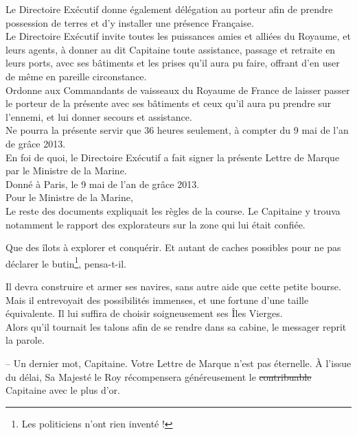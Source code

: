 Le Directoire Exécutif donne également délégation au porteur afin de prendre possession de terres et d'y installer une présence Française.\\

Le Directoire Exécutif invite toutes les puissances amies et alliées du Royaume, et leurs agents, à donner au dit Capitaine toute assistance, passage et retraite en leurs ports, avec ses bâtiments et les prises qu'il aura pu faire, offrant d'en user de même en pareille circonstance.\\

Ordonne aux Commandants de vaisseaux du Royaume de France de laisser passer le porteur de la présente avec ses bâtiments et ceux qu'il aura pu prendre sur l'ennemi, et lui donner secours et assistance.\\

Ne pourra la présente servir que 36 heures seulement, à compter du 9 mai de l'an de grâce 2013.\\

En foi de quoi, le Directoire Exécutif a fait signer la présente Lettre de Marque par le Ministre de la Marine.\\

Donné à Paris, le 9 mai de l'an de grâce 2013.\\

Pour le Ministre de la Marine,\\


Le reste des documents expliquait les règles de la course. Le Capitaine y trouva notamment le rapport des explorateurs sur la zone qui lui était confiée.

Que des îlots à explorer et conquérir. Et autant de caches possibles pour ne pas déclarer le butin\footnote{Les politiciens n'ont rien inventé !}, pensa-t-il.

Il devra construire et armer ses navires, sans autre aide que cette petite bourse. Mais il entrevoyait des possibilités immenses, et une fortune d'une taille équivalente. Il lui suffira de choisir soigneusement ses Îles Vierges.\\

Alors qu'il tournait les talons afin de se rendre dans sa cabine, le messager reprit la parole.

-- Un dernier mot, Capitaine. Votre Lettre de Marque n'est pas éternelle. À l'issue du délai, Sa Majesté le Roy récompensera généreusement le \st{contribuable} Capitaine avec le plus d'or.\\

